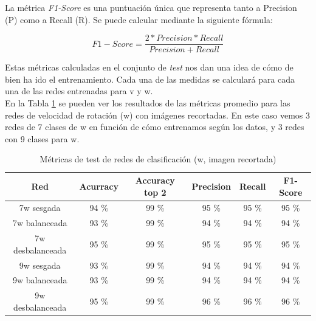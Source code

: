 La métrica \textit{F1-Score} es una puntuación única que representa tanto a Precision (P) como a Recall (R). Se puede calcular mediante la siguiente fórmula:

\[F1-Score =  \frac{2 * Precision * Recall}{Precision + Recall} \]
\vspace{10pt}


Estas métricas calculadas en el conjunto de \textit{test} nos dan una idea de cómo de bien ha ido el entrenamiento. Cada una de las medidas se calculará para cada una de las redes entrenadas para v y w.\\

En la Tabla \ref{metricas_classificacion_recortada_w} se pueden ver los resultados de las métricas promedio para las redes de velocidad de rotación (w) con imágenes recortadas. En este caso vemos 3 redes de 7 clases de w en función de cómo entrenamos según los datos, y 3 redes con 9 clases para w.\\


\begin{table}[H]
\centering
\caption{Métricas de test de redes de clasificación (w, imagen recortada)}
\label{metricas_classificacion_recortada_w}
\begin{tabular}{c|c|c|c|c|c|}
\cline{1-6}
                        \multicolumn{1}{|c|}{Red}    & Acurracy       & Accuracy top 2      & Precision       & Recall        & F1-Score        \\ \hline
\multicolumn{1}{|c|}{7w sesgada}    & 94 \%             & 99 \%         & 95 \%            & 95 \%          & 95 \%       \\ \hline
\multicolumn{1}{|c|}{7w balanceada}     & 93 \%             & 99 \%          &  94 \%              &  94 \%            &  94 \%             \\ \hline
\multicolumn{1}{|c|}{7w desbalanceada}      &  95 \%             & 99 \%           &  95 \%            & 95 \%        &  95 \%            \\ \hline
\multicolumn{1}{|c|}{9w sesgada}       &  93 \%     &  99 \%      &  94 \%           &  94 \%            &  94 \%               \\ \hline
\multicolumn{1}{|c|}{9w balanceada}      &  93 \%         &  99 \%        &  94 \%         &  94 \%      &  94 \%          \\ \hline
\multicolumn{1}{|c|}{9w desbalanceada}     & 95 \%          & 99 \%        & 96 \%           & 96 \%         & 96 \%                \\ \hline
\end{tabular}
\end{table}

